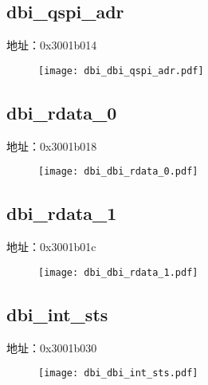 \subsection{dbi\_qspi\_adr}
\label{dbi-dbi-qspi-adr}
地址：0x3001b014
 \begin{figure}[H]
\texttt{[image: dbi\_dbi\_qspi\_adr.pdf]}
\end{figure}

\subsection{dbi\_rdata\_0}
\label{dbi-dbi-rdata-0}
地址：0x3001b018
 \begin{figure}[H]
\texttt{[image: dbi\_dbi\_rdata\_0.pdf]}
\end{figure}

\subsection{dbi\_rdata\_1}
\label{dbi-dbi-rdata-1}
地址：0x3001b01c
 \begin{figure}[H]
\texttt{[image: dbi\_dbi\_rdata\_1.pdf]}
\end{figure}

\subsection{dbi\_int\_sts}
\label{dbi-dbi-int-sts}
地址：0x3001b030
 \begin{figure}[H]
\texttt{[image: dbi\_dbi\_int\_sts.pdf]}
\end{figure}

